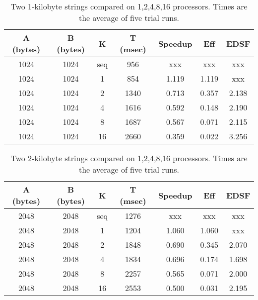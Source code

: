 \begin{table}[h]
	\begin{center}
		\begin{tabular}{ | c | c | c | c | c | c | c |}
			\hline 
			A (bytes)&	B (bytes) &	K	&	T (msec)	&	Speedup	&	Eff	&	EDSF \\
			\hline		
			1024    &	1024    &	seq	&	956		&	xxx		&	xxx	&	xxx \\
			1024    &	1024    &	1	&	854		&1.119	&1.119&	xxx \\
			1024    &	1024    &	2	&	1340 	&0.713	&0.357&2.138\\
			1024    &	1024    &	4	&	1616 	&0.592	&0.148&2.190\\
			1024    &	1024    &	8	&	1687 	&0.567	&0.071&2.115\\
			1024    &	1024    &	16	&	2660 	&0.359	&0.022&3.256\\
			\hline
		\end{tabular}
	\end{center}
	\caption{Two 1-kilobyte strings compared on {1,2,4,8,16} processors. Times are the average of five trial runs.}
\end{table}

\begin{table}[h]
	\begin{center}
		\begin{tabular}{ | c | c | c | c | c | c | c |}
			\hline 
			A (bytes)&	B (bytes) &	K	&	T (msec)	&	Speedup	&	Eff	&	EDSF \\
			\hline		
			2048    &	2048    &	seq	&	1276	&	xxx		&	xxx	&	xxx \\
			2048   	&	2048   	&	1	&	1204	&	1.060	&1.060&	xxx \\
			2048   	&	2048   	&	2	&	1848 	&	0.690	&0.345&2.070\\
			2048   	&	2048   	&	4	&	1834 	&	0.696	&0.174&1.698\\
			2048   	&	2048   	&	8	&	2257 	&	0.565	&0.071&2.000\\
			2048   	&	2048   	&	16	&	2553 	&	0.500	&0.031&2.195\\
			\hline
		\end{tabular}
	\end{center}
	\caption{Two 2-kilobyte strings compared on {1,2,4,8,16} processors. Times are the average of five trial runs.}
\end{table}


